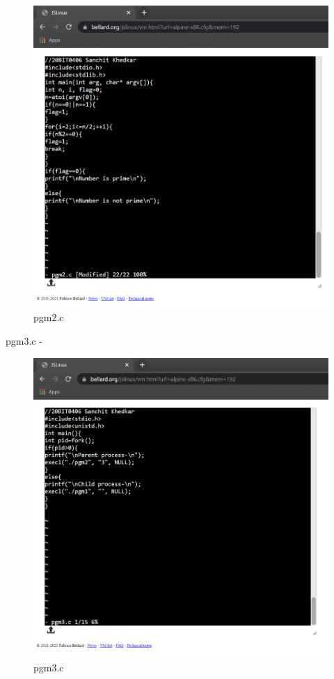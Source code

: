 \documentclass[12pt]{article}
\begin{document}
\begin{figure}[h] %
\centering
\includegraphics[width=\textwidth]{pgm2.png}
\caption{pgm2.c}
\end{figure}
\newpage
pgm3.c -
\begin{figure}[h] %
\centering
\includegraphics[width=\textwidth]{pgm3.png}
\caption{pgm3.c}
\end{figure}
\end{document}
